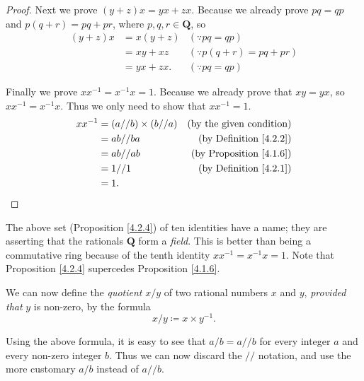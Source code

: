 \begin{proof}
    Next we prove \((y + z)x = yx + zx\).
    Because we already prove \(pq = qp\) and \(p(q + r) = pq + pr\), where \(p, q, r \in \mathbf{Q}\),
    so
    \begin{align*}
        (y + z)x & = x(y + z) & (\because pq = qp)            \\
                 & = xy + xz  & (\because p(q + r) = pq + pr) \\
                 & = yx + zx. & (\because pq = qp)
    \end{align*}

    Finally we prove \(xx^{-1} = x^{-1}x = 1\).
    Because we already prove that \(xy = yx\), so \(xx^{-1} = x^{-1}x\).
    Thus we only need to show that \(xx^{-1} = 1\).
    \begin{align*}
        xx^{-1} & = (a // b) \times (b // a) & \text{(by the given condition)}     \\
                & = ab // ba                 & \text{(by Definition \ref{4.2.2})}  \\
                & = ab // ab                 & \text{(by Proposition \ref{4.1.6})} \\
                & = 1 // 1                   & \text{(by Definition \ref{4.2.1})}  \\
                & = 1.
    \end{align*}
\end{proof}

\begin{remark}\label{4.2.5}
    The above set (Proposition \ref{4.2.4}) of ten identities have a name;
    they are asserting that the rationals \(\mathbf{Q}\) form a \emph{field}.
    This is better than being a commutative ring because of the tenth identity \(xx^{-1} = x^{-1}x = 1\).
    Note that Proposition \ref{4.2.4} supercedes Proposition \ref{4.1.6}.
\end{remark}

\begin{note}
    We can now define the \emph{quotient} \(x / y\) of two rational numbers \(x\) and \(y\), \emph{provided that} \(y\) is non-zero, by the formula
    \[
        x / y \coloneqq x \times y^{-1}.
    \]
\end{note}

\begin{note}
    Using the above formula, it is easy to see that \(a / b = a // b\) for every integer \(a\) and every non-zero integer \(b\).
    Thus we can now discard the \(//\) notation, and use the more customary \(a / b\) instead of \(a // b\).
\end{note}

